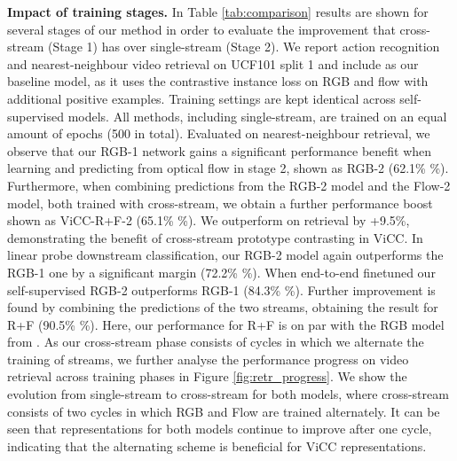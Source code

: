 \documentclass[10pt,twocolumn,letterpaper]{article}
\begin{document}
\textbf{Impact of training stages.} In Table \ref{tab:comparison} results are shown for several stages of our method in order to evaluate the improvement that cross-stream (Stage 1) has over single-stream (Stage 2). We report action recognition and nearest-neighbour video retrieval on UCF101 split 1 and include \cite{han_self-supervised_2020} as our baseline model, as it uses the contrastive instance loss on RGB and flow with additional positive examples. Training settings are kept identical across self-supervised models. All methods, including single-stream, are trained on an equal amount of epochs (500 in total). 
Evaluated on nearest-neighbour retrieval, we observe that our RGB-1 network gains a significant performance benefit when learning and predicting from optical flow in stage 2, shown as RGB-2 (62.1\% \%). Furthermore, when combining predictions from the RGB-2 model and the Flow-2 model, both trained with cross-stream, we obtain a further performance boost shown as ViCC-R+F-2 (65.1\% \%). We outperform \cite{han_self-supervised_2020} on retrieval by +9.5\%, demonstrating the benefit of cross-stream prototype contrasting in ViCC. In linear probe downstream classification, our RGB-2 model again outperforms the RGB-1 one by a significant margin (72.2\% \%). When end-to-end finetuned our self-supervised RGB-2 outperforms RGB-1 (84.3\% \%). Further improvement is found by combining the predictions of the two streams, obtaining the result for R+F (90.5\% \%). Here, our performance for R+F is on par with the RGB model from \cite{han_self-supervised_2020}. As our cross-stream phase consists of cycles in which we alternate the training of streams, we further analyse the performance progress on video retrieval across training phases in Figure \ref{fig:retr_progress}. We show the evolution from single-stream to cross-stream for both models, where cross-stream consists of two cycles in which RGB and Flow are trained alternately. It can be seen that representations for both models continue to improve after one cycle, indicating that the alternating scheme is beneficial for ViCC representations.
\end{document}
